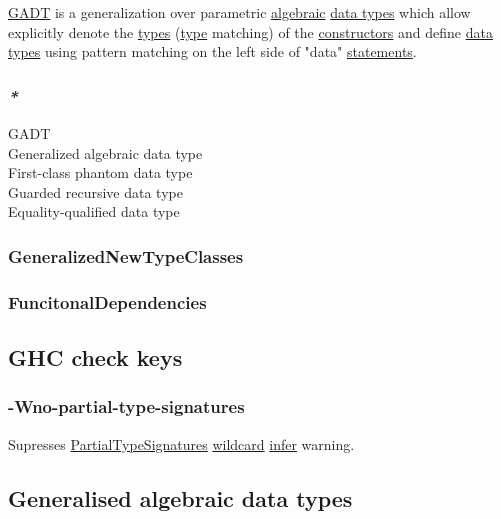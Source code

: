 \documentclass[11pt]{article}
\begin{document}
\hyperref[org74d64c6]{GADT} is a generalization over parametric \hyperref[orge9081c5]{algebraic} \hyperref[org5c444ae]{data types} which allow explicitly denote the \hyperref[org4209edd]{types} (\hyperref[orgc4aea2f]{type} matching) of the \hyperref[org7a9d75a]{constructors} and define \hyperref[org5c444ae]{data types} using pattern matching on the left side of "data" \hyperref[org0c99cef]{statements}.\\

\subsubsection{\emph{*}}
\label{sec:org08281bf}

\label{org74d64c6}GADT\\
\label{orgddc53ca}Generalized algebraic data type\\
\label{org5406fb7}First-class phantom data type\\
\label{org99ec91d}Guarded recursive data type\\
\label{orgf544937}Equality-qualified data type\\

\subsubsection{\label{org01e687e}GeneralizedNewTypeClasses}
\label{sec:org212d12f}

\subsubsection{\label{org7bf42de}FuncitonalDependencies}
\label{sec:org1d90d29}

\subsection{\label{org33630de}GHC check keys}
\label{sec:org23447a3}

\subsubsection{\label{org73877c4}-Wno-partial-type-signatures}
\label{sec:orgce7e7d7}

Supresses \hyperref[orgdd7d979]{PartialTypeSignatures} \hyperref[orgdf69265]{wildcard} \hyperref[org6da926a]{infer} warning.\\

\subsection{\label{orgbc0b7ca}Generalised algebraic data types}
\label{sec:orgf4094f0}
\end{document}
